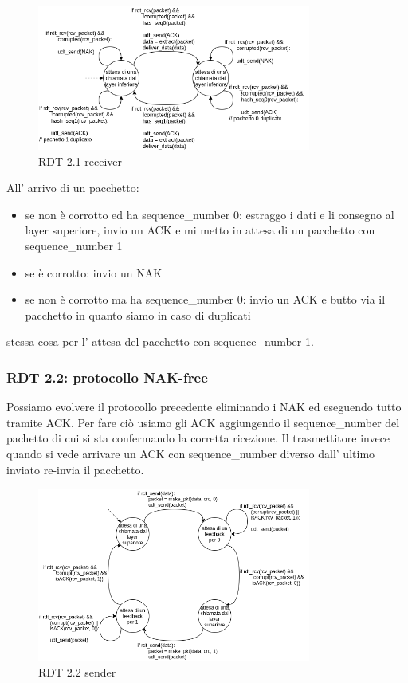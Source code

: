 \begin{figure}[H]
    \centering
    \includegraphics[width=340px]{images/3_Reti_connessione_diretta/rdt_2.1_receiver.png}
    \caption{RDT 2.1 receiver}
\end{figure}
All' arrivo di un pacchetto:
\begin{itemize}
    \item se non è corrotto ed ha sequence\_number 0: estraggo i dati e li consegno al layer superiore, invio un ACK e mi metto in attesa di un pacchetto con sequence\_number 1
    \item se è corrotto: invio un NAK
    \item se non è corrotto ma ha sequence\_number 0: invio un ACK e butto via il pacchetto in quanto siamo in caso di duplicati
\end{itemize}
stessa cosa per l' attesa del pacchetto con sequence\_number 1.


\subsubsection{RDT 2.2: protocollo NAK-free}
Possiamo evolvere il protocollo precedente eliminando i NAK ed eseguendo tutto tramite ACK.
Per fare ciò usiamo gli ACK aggiungendo il sequence\_number del pachetto di cui si sta confermando la corretta ricezione.
Il trasmettitore invece quando si vede arrivare un ACK con sequence\_number diverso dall' ultimo inviato re-invia il pacchetto.
\begin{figure}[H]
    \centering
    \includegraphics[width=340px]{images/3_Reti_connessione_diretta/rdt_2.2_sender.png}
    \caption{RDT 2.2 sender}
\end{figure}

